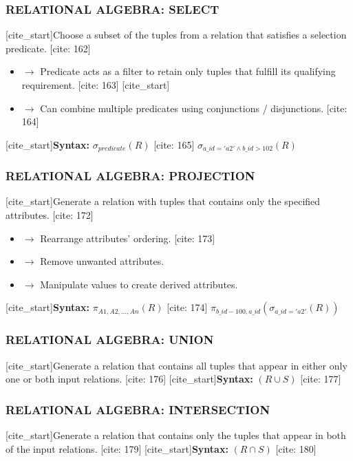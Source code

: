 \documentclass[aspectratio=169]{beamer}
\begin{document}
\begin{frame}
    \frametitle{RELATIONAL ALGEBRA: SELECT}
    [cite_start]Choose a subset of the tuples from a relation that satisfies a selection predicate. [cite: 162]
    \begin{itemize}
        [cite_start]\item $\rightarrow$ Predicate acts as a filter to retain only tuples that fulfill its qualifying requirement. [cite: 163]
        [cite_start]\item $\rightarrow$ Can combine multiple predicates using conjunctions / disjunctions. [cite: 164]
    \end{itemize}
    \vspace{1em}
    [cite_start]\textbf{Syntax:} $\sigma_{predicate}(R)$ [cite: 165]
    \vspace{1em}
    \centering
    $\sigma_{a\_id='a2' \land b\_id>102}(R)$
\end{frame}

\begin{frame}
    \frametitle{RELATIONAL ALGEBRA: PROJECTION}
    [cite_start]Generate a relation with tuples that contains only the specified attributes. [cite: 172]
    \begin{itemize}
        [cite_start]\item $\rightarrow$ Rearrange attributes’ ordering. [cite: 173]
        \item $\rightarrow$ Remove unwanted attributes.
        \item $\rightarrow$ Manipulate values to create derived attributes.
    \end{itemize}
    \vspace{1em}
    [cite_start]\textbf{Syntax:} $\pi_{A1,A2,\dots,An}(R)$ [cite: 174]
    \vspace{1em}
    \centering
    $\pi_{b\_id-100,a\_id}(\sigma_{a\_id='a2'}(R))$
\end{frame}

\begin{frame}
    \frametitle{RELATIONAL ALGEBRA: UNION}
    [cite_start]Generate a relation that contains all tuples that appear in either only one or both input relations. [cite: 176]
    \vspace{1em}
    [cite_start]\textbf{Syntax:} $(R \cup S)$ [cite: 177]
\end{frame}

\begin{frame}
    \frametitle{RELATIONAL ALGEBRA: INTERSECTION}
    [cite_start]Generate a relation that contains only the tuples that appear in both of the input relations. [cite: 179]
    \vspace{1em}
    [cite_start]\textbf{Syntax:} $(R \cap S)$ [cite: 180]
\end{frame}
\end{document}
